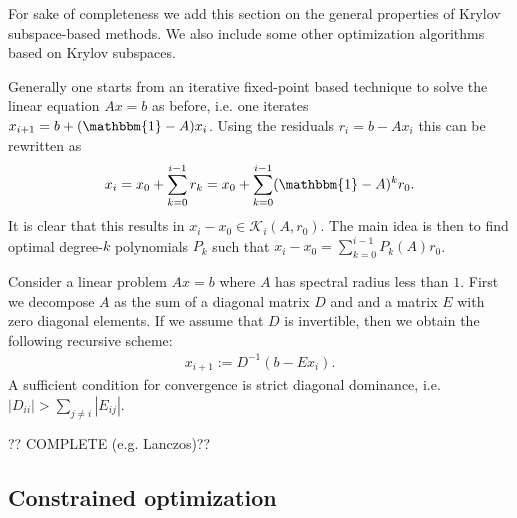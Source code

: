     For sake of completeness we add this section on the general properties of Krylov subspace-based methods. We also include some other optimization algorithms based on Krylov subspaces.

    Generally one starts from an iterative fixed-point based technique to solve the linear equation $Ax=b$ as before, i.e. one iterates $x_{i+1} = b + (\mathbbm{1}-A)x_i$. Using the residuals $r_i = b - Ax_i$ this can be rewritten as
    \begin{gather}
        x_i = x_0 + \sum_{k=0}^{i-1}r_k = x_0 + \sum_{k=0}^{i-1}(\mathbbm{1}-A)^kr_0.
    \end{gather}
    It is clear that this results in $x_i-x_0\in\mathcal{K}_i(A, r_0)$. The main idea is then to find optimal degree-$k$ polynomials $P_k$ such that $x_i-x_0=\sum_{k=0}^{i-1}P_k(A)r_0$.

    \begin{method}
        Consider a linear problem $Ax=b$ where $A$ has spectral radius less than $1$. First we decompose $A$ as the sum of a diagonal matrix $D$ and and a matrix $E$ with zero diagonal elements. If we assume that $D$ is invertible, then we obtain the following recursive scheme:
        \begin{gather}
            x_{i+1} := D^{-1}(b-Ex_i).
        \end{gather}
        A sufficient condition for convergence is strict diagonal dominance, i.e. $|D_{ii}|>\sum_{j\neq i}|E_{ij}|$.
    \end{method}

    ?? COMPLETE (e.g. Lanczos)??

\subsection{Constrained optimization}

